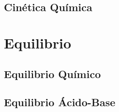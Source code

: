 \documentclass[
    11pt, %
    a4paper, %
]{

}
\begin{document}

    \chapter{Cinética Química}

    

    \newpage

    



    \part{Equilibrio}


    \chapterspaceabove{6.75cm} %
    \chapterspacebelow{7.25cm} %






    \chapter{Equilibrio Químico}

    

    \newpage

    


    


    \chapter{Equilibrio Ácido-Base}
\end{document}
